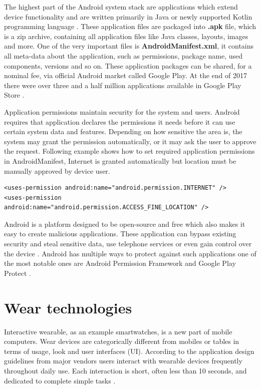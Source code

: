 The highest part of the Android system stack are applications which extend device functionality and are written primarily in Java or newly supported Kotlin programming language \cite{SoASTaD}. These application files are packaged into \textbf{.apk} file, which is a zip archive, containing all application files like Java classes, layouts, images and more. One of the very important files is \textbf{AndroidManifest.xml}, it contains all meta-data about the application, such as permissions, package name, used components, versions and so on. These application packages can be shared, for a nominal fee, via official Android market called Google Play. At the end of 2017 there were over three and a half million applications available in Google Play Store \cite{SoASTaD, NoAAiGPS, NoAA}.

Application permissions maintain security for the system and users. Android requires that application declares the permissions it needs before it can use certain system data and features. Depending on how sensitive the area is, the system may grant the permission automatically, or it may ask the user to approve the request. Following example shows how to set required application permissions in AndroidManifest, Internet is granted automatically but location must be manually approved by device user.

\begin{lstlisting}[caption=Application permission settings]
<uses-permission android:name="android.permission.INTERNET" />
<uses-permission android:name="android.permission.ACCESS_FINE_LOCATION" />
\end{lstlisting}

Android is a platform designed to be open-source and free which also makes it easy to create malicious applications. These application can bypass existing security and steal sensitive data, use telephone services or even gain control over the device \cite{ASIMPD}. Android has multiple ways to protect against such applications one of the most notable ones are Android Permission Framework and Google Play Protect \cite{SoASTaD}.

\section{Wear technologies}\label{sec:WearTechnologies}
Interactive wearable, as an example smartwatches, is a new part of mobile computers. Wear devices are categorically different from mobiles or tables in terms of usage, look and user interfaces (UI). According to the application design guidelines from major vendors users interact with wearable devices frequently throughout daily use. Each interaction is short, often less than 10 seconds, and dedicated to complete simple tasks \cite{UtCoAWO}. 

